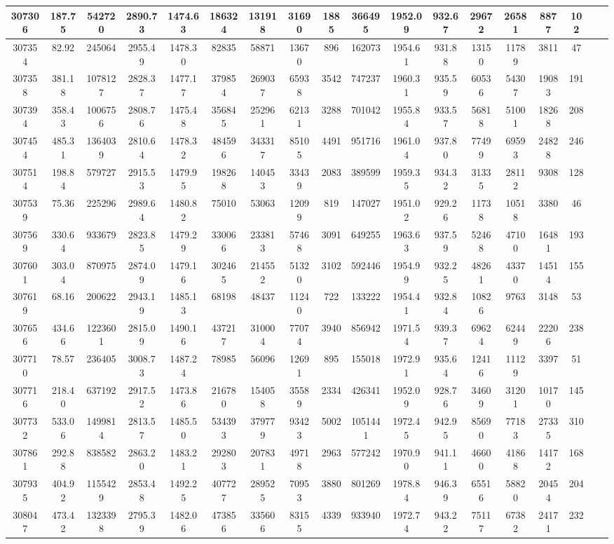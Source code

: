 \documentclass[10pt]{extarticle}
\begin{document}
\begin{longtable}{|c|c|c|c|c|c|c|c|c|c|c|c|c|c|c|c|c|c|}
\hline 
307306&187.75&542720&2890.73&1474.63&186324&131918&31690&1885&366495&1952.09&932.67&29672&26581&8877&102 \\ 
\hline 
307354&82.92&245064&2955.49&1478.30&82835&58871&13670&896&162073&1954.61&931.88&13150&11789&3811&47 \\ 
\hline 
307358&381.18&1078127&2828.37&1477.17&379854&269037&65938&3542&747237&1960.31&935.59&60536&54307&19083&191 \\ 
\hline 
307394&358.43&1006756&2808.76&1475.48&356845&252961&62131&3288&701042&1955.84&933.57&56818&51001&18268&208 \\ 
\hline 
307454&485.31&1364039&2810.64&1478.32&484596&343317&85105&4491&951716&1961.04&937.80&77499&69593&24828&246 \\ 
\hline 
307514&198.84&579727&2915.53&1479.95&198268&140453&33439&2083&389599&1959.35&934.32&31335&28112&9308&128 \\ 
\hline 
307539&75.36&225296&2989.64&1480.82&75010&53063&12099&819&147027&1951.02&929.26&11738&10518&3380&46 \\ 
\hline 
307569&330.64&933679&2823.85&1479.29&330066&233813&57468&3091&649255&1963.63&937.59&52468&47100&16481&193 \\ 
\hline 
307601&303.04&870975&2874.09&1479.16&302465&214552&51320&3102&592446&1954.99&932.25&48261&43370&14514&155 \\ 
\hline 
307619&68.16&200622&2943.19&1485.13&68198&48437&11240&722&133222&1954.41&932.84&10826&9763&3148&53 \\ 
\hline 
307656&434.66&1223601&2815.09&1490.16&437217&310004&77074&3940&856942&1971.54&939.37&69624&62449&22206&238 \\ 
\hline 
307710&78.57&236405&3008.73&1487.24&78985&56096&12691&895&155018&1972.91&935.64&12416&11129&3397&51 \\ 
\hline 
307716&218.40&637192&2917.52&1473.86&216780&154058&35589&2334&426341&1952.09&928.76&34609&31201&10170&145 \\ 
\hline 
307732&533.06&1499814&2813.57&1485.50&534393&379779&93423&5002&1051441&1972.45&942.95&85690&77183&27335&310 \\ 
\hline 
307861&292.88&838582&2863.20&1483.21&292803&207831&49718&2963&577242&1970.90&941.11&46600&41868&14172&168 \\ 
\hline 
307935&404.92&1155429&2853.48&1492.25&407727&289525&70953&3880&801269&1978.84&946.39&65516&58820&20454&204 \\ 
\hline 
308047&473.42&1323398&2795.39&1482.06&473856&335606&83155&4339&933940&1972.74&943.22&75117&67382&24171&232 \\ 

\end{longtable}
\end{document}
